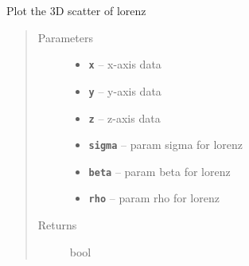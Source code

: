 \documentclass[letterpaper,10pt,english]{sphinxmanual}
\begin{document}

\begin{fulllineitems}
\label{_autosummary/lorenz:lorenz.plot.plot3Dpdf}
Plot the 3D scatter of lorenz
\begin{quote}\begin{description}
\item[{Parameters}] \leavevmode\begin{itemize}
\item {} 
\textbf{\texttt{x}} -- x-axis data

\item {} 
\textbf{\texttt{y}} -- y-axis data

\item {} 
\textbf{\texttt{z}} -- z-axis data

\item {} 
\textbf{\texttt{sigma}} -- param sigma for lorenz

\item {} 
\textbf{\texttt{beta}} -- param beta for lorenz

\item {} 
\textbf{\texttt{rho}} -- param rho for lorenz

\end{itemize}

\item[{Returns}] \leavevmode
bool

\end{description}\end{quote}

\end{fulllineitems}

\end{document}

